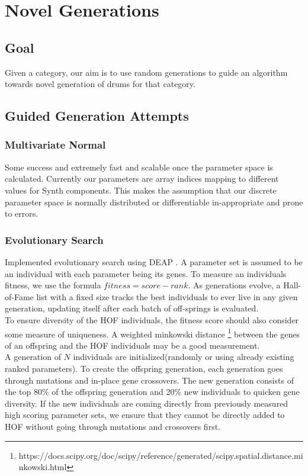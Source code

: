 \documentclass{nime-alternate} %
\begin{document}
\section{Novel Generations}
\subsection{Goal}
 Given a category, our aim is to use random generations to guide an algorithm towards novel generation of drums for that category.

\subsection{Guided Generation Attempts}

\subsubsection{Multivariate Normal}
Some success and extremely fast and scalable once the parameter space is calculated. Currently our parameters are array indices mapping to different values for Synth components. This makes the assumption that our discrete parameter space is normally distributed or differentiable in-appropriate and prone to errors. 

\subsubsection{Evolutionary Search}
Implemented evolutionary search using DEAP \citep{DEAP_JMLR2012}. A parameter set is assumed to be an individual with each parameter being its genes. To measure an individuals fitness, we use the formula $fitness=score-rank$. As generations evolve, a Hall-of-Fame list with a fixed size tracks the best individuals to ever live in any given generation, updating itself after each batch of off-springs is evaluated.\\
To ensure diversity of the HOF individuals, the fitness score should also consider some measure of uniqueness. A weighted minkowski distance \footnote{https://docs.scipy.org/doc/scipy/reference/generated/scipy.spatial.distance.minkowski.html} between the genes of an offspring and the HOF individuals may be a good measurement.\\
A generation of $N$ individuals are initialized(randomly or using already existing ranked parameters). To create the offspring generation, each generation goes through mutations and in-place gene crossovers. The new generation consists of the top 80\% of the offspring generation and 20\% new individuals to quicken gene diversity. If the new individuals are coming directly from previously measured high scoring parameter sets, we ensure that they cannot be directly added to HOF without going through mutations and crossovers first. 



     
\end{document}

